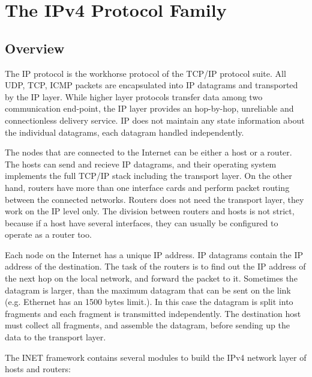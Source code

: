 \chapter{The IPv4 Protocol Family}
\label{cha:ipv4}


\section{Overview}
\label{sec:ipv4:overview}

The IP protocol is the workhorse protocol of the TCP/IP protocol suite.
All UDP, TCP, ICMP packets are encapsulated into IP datagrams and
transported by the IP layer.
While higher layer protocols transfer data among two communication end-point,
the IP layer provides an hop-by-hop, unreliable and connectionless delivery
service. IP does not maintain any state information about the individual
datagrams, each datagram handled independently.

The nodes that are connected to the Internet can be either a host or a router.
The hosts can send and recieve IP datagrams, and their operating system
implements the full TCP/IP stack including the transport layer. On the
other hand, routers have more than one interface cards and perform packet
routing between the connected networks. Routers does not need the
transport layer, they work on the IP level only. The division
between routers and hosts is not strict, because if a host
have several interfaces, they can usually be configured to operate
as a router too.

Each node on the Internet has a unique IP address. IP datagrams contain
the IP address of the destination. The task of the routers is to find
out the IP address of the next hop on the local network, and forward
the packet to it. Sometimes the datagram is larger, than the maximum
datagram that can be sent on the link (e.g. Ethernet has an 1500 bytes limit.).
In this case the datagram is split into fragments and each fragment is
transmitted independently. The destination host must collect all fragments,
and assemble the datagram, before sending up the data to the transport
layer.

The INET framework contains several modules to build the IPv4 network layer of
hosts and routers:

